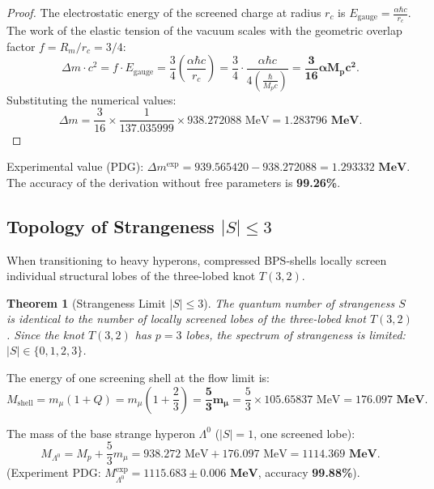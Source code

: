 \documentclass[12pt,a4paper]{article}
\newtheorem{theorem}{Theorem}
\begin{document}
	\begin{proof}
	The electrostatic energy of the screened charge at radius $r_c$ is $E_{\text{gauge}} = \frac{\alpha \hbar c}{r_c}$. The work of the elastic tension of the vacuum scales with the geometric overlap factor $f = R_m / r_c = 3/4$:
	\begin{equation}
	\Delta m \cdot c^2 = f \cdot E_{\text{gauge}} = \frac{3}{4} \left( \frac{\alpha \hbar c}{r_c} \right) = \frac{3}{4} \cdot \frac{\alpha \hbar c}{4 \left( \frac{\hbar}{M_p c} \right)} = \mathbf{\frac{3}{16} \alpha M_p c^2}.
	\end{equation}
	Substituting the numerical values:
	\begin{equation}
	\Delta m = \frac{3}{16} \times \frac{1}{137.035999} \times 938.272088 \text{ MeV} = \mathbf{1.283796 \text{ MeV}}.
	\end{equation}
	\end{proof}
	Experimental value (PDG): $\Delta m^{\text{exp}} = 939.565420 - 938.272088 = \mathbf{1.293332 \text{ MeV}}$. The accuracy of the derivation without free parameters is \textbf{99.26\%}.
								
	\subsection{Topology of Strangeness $|S| \le 3$}
	When transitioning to heavy hyperons, compressed BPS-shells locally screen individual structural lobes of the three-lobed knot $T(3,2)$.
								
	\begin{theorem}[Strangeness Limit $|S| \le 3$]
	The quantum number of strangeness $S$ is identical to the number of locally screened lobes of the three-lobed knot $T(3,2)$. Since the knot $T(3,2)$ has $p=3$ lobes, the spectrum of strangeness is limited: $|S| \in \{0, 1, 2, 3\}$.
	\end{theorem}
							
	The energy of one screening shell at the flow limit is:
	\begin{equation}
	M_{\text{shell}} = m_\mu (1 + Q) = m_\mu \left(1 + \frac{2}{3}\right) = \mathbf{\frac{5}{3} m_\mu} = \frac{5}{3} \times 105.65837 \text{ MeV} = \mathbf{176.097 \text{ MeV}}.
	\end{equation}
								
	The mass of the base strange hyperon $\Lambda^0$ ($|S|=1$, one screened lobe):
	\begin{equation}
	M_{\Lambda^0} = M_p + \frac{5}{3} m_\mu = 938.272 \text{ MeV} + 176.097 \text{ MeV} = \mathbf{1114.369 \text{ MeV}}.
	\end{equation}
	(Experiment PDG: $M_{\Lambda^0}^{\text{exp}} = \mathbf{1115.683 \pm 0.006 \text{ MeV}}$, accuracy \textbf{99.88\%}).
								
\end{document}
